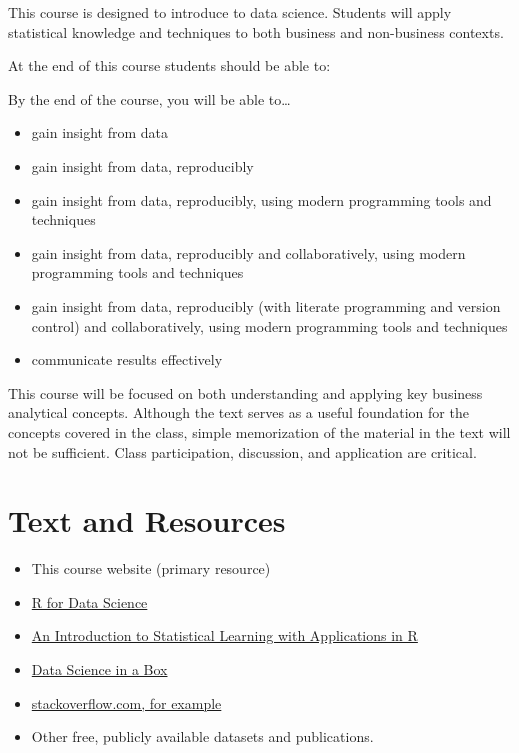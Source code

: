 \documentclass[
]{book}
\providecommand{\tightlist}{%
  \setlength{\itemsep}{0pt}\setlength{\parskip}{0pt}}
\begin{document}
This course is designed to introduce to data science. Students will apply statistical knowledge and techniques to both business and non-business contexts.

At the end of this course students should be able to:

By the end of the course, you will be able to\ldots{}

\begin{itemize}
\tightlist
\item
  gain insight from data
\item
  gain insight from data, reproducibly
\item
  gain insight from data, reproducibly, using modern programming tools and techniques
\item
  gain insight from data, reproducibly and collaboratively, using modern programming tools and techniques
\item
  gain insight from data, reproducibly (with literate programming and version control) and collaboratively, using modern programming tools and techniques
\item
  communicate results effectively
\end{itemize}

This course will be focused on both understanding and applying key business analytical concepts. Although the text serves as a useful foundation for the concepts covered in the class, simple memorization of the material in the text will not be sufficient. Class participation, discussion, and application are critical.

\hypertarget{text-and-resources}{%
\section{Text and Resources}\label{text-and-resources}}

\begin{itemize}
\tightlist
\item
  This course website (primary resource)
\item
  \href{https://r4ds.had.co.nz/}{R for Data Science}
\item
  \href{https://trevorhastie.github.io/ISLR/}{An Introduction to Statistical Learning with Applications in R}
\item
  \href{https://datasciencebox.org/}{Data Science in a Box}
\item
  \href{https://stackoverflow.com/questions/4862178/remove-rows-with-all-or-some-nas-missing-values-in-data-frame?rq=1}{stackoverflow.com, for example}
\item
  Other free, publicly available datasets and publications.
\end{itemize}
\end{document}
